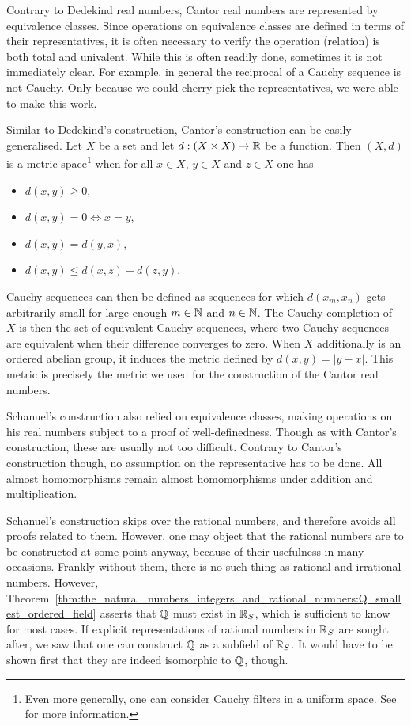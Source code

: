 \documentclass[../main.tex]{subfiles}
\begin{document}
Contrary to Dedekind real numbers, Cantor real numbers are represented by equivalence classes. Since operations on equivalence classes are defined in terms of their representatives, it is often necessary to verify the operation (relation) is both total and univalent. While this is often readily done, sometimes it is not immediately clear. For example, in general the reciprocal of a Cauchy sequence is not Cauchy. Only because we could cherry-pick the representatives, we were able to make this work.

Similar to Dedekind's construction, Cantor's construction can be easily generalised. Let $X$ be a set and let $d:(X\times X)\to\mathbb{R}$ be a function. Then $(X,d)$ is a metric space\footnote{Even more generally, one can consider Cauchy filters in a uniform space. See~\cite{Kelley1975} for more information.} when for all $x\in X$, $y\in X$ and $z\in X$ one has
\begin{itemize}
    \item $d(x,y)\geq0$,
    \item $d(x,y)=0\iff x=y$,
    \item $d(x,y)=d(y,x)$,
    \item $d(x,y)\leq d(x,z)+d(z,y)$.
\end{itemize}
Cauchy sequences can then be defined as sequences for which $d(x_m,x_n)$ gets arbitrarily small for large enough $m\in\mathbb{N}$ and $n\in\mathbb{N}$. The Cauchy-completion of $X$ is then the set of equivalent Cauchy sequences, where two Cauchy sequences are equivalent when their difference converges to zero. When $X$ additionally is an ordered abelian group, it induces the metric defined by $d(x,y)=\vert y-x\vert$. This metric is precisely the metric we used for the construction of the Cantor real numbers.

Schanuel's construction also relied on equivalence classes, making operations on his real numbers subject to a proof of well-definedness. Though as with Cantor's construction, these are usually not too difficult. Contrary to Cantor's construction though, no assumption on the representative has to be done. All almost homomorphisms remain almost homomorphisms under addition and multiplication.

Schanuel's construction skips over the rational numbers, and therefore avoids all proofs related to them. However, one may object that the rational numbers are to be constructed at some point anyway, because of their usefulness in many occasions. Frankly without them, there is no such thing as rational and irrational numbers. However, Theorem~\ref{thm:the_natural_numbers_integers_and_rational_numbers:Q_smallest_ordered_field} asserts that $\mathbb{Q}$ must exist in $\mathbb{R}_S$, which is sufficient to know for most cases. If explicit representations of rational numbers in $\mathbb{R}_S$ are sought after, we saw that one can construct $\mathbb{Q}$ as a subfield of $\mathbb{R}_S$. It would have to be shown first that they are indeed isomorphic to $\mathbb{Q}$, though.
\end{document}
